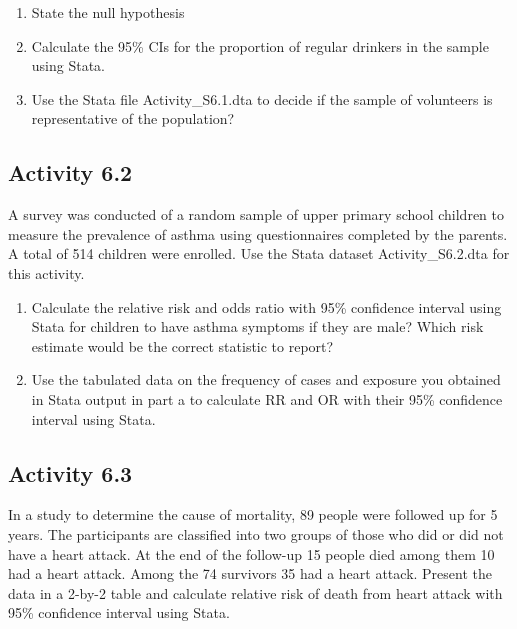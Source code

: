 \documentclass[
]{memoir}
\providecommand{\tightlist}{%
  \setlength{\itemsep}{0pt}\setlength{\parskip}{0pt}}
\begin{document}
\begin{enumerate}
\def\labelenumi{\alph{enumi})}
\tightlist
\item
  State the null hypothesis
\item
  Calculate the 95\% CIs for the proportion of regular drinkers in the sample using Stata.
\item
  Use the Stata file Activity\_S6.1.dta to decide if the sample of volunteers is representative of the population?
\end{enumerate}

\hypertarget{activity-6.2}{%
\subsection*{Activity 6.2}\label{activity-6.2}}

A survey was conducted of a random sample of upper primary school children to measure the prevalence of asthma using questionnaires completed by the parents. A total of 514 children were enrolled. Use the Stata dataset Activity\_S6.2.dta for this activity.

\begin{enumerate}
\def\labelenumi{\alph{enumi})}
\tightlist
\item
  Calculate the relative risk and odds ratio with 95\% confidence interval using Stata for children to have asthma symptoms if they are male? Which risk estimate would be the correct statistic to report?
\item
  Use the tabulated data on the frequency of cases and exposure you obtained in Stata output in part a to calculate RR and OR with their 95\% confidence interval using Stata.
\end{enumerate}

\hypertarget{activity-6.3}{%
\subsection*{Activity 6.3}\label{activity-6.3}}

In a study to determine the cause of mortality, 89 people were followed up for 5 years. The participants are classified into two groups of those who did or did not have a heart attack. At the end of the follow-up 15 people died among them 10 had a heart attack. Among the 74 survivors 35 had a heart attack. Present the data in a 2-by-2 table and calculate relative risk of death from heart attack with 95\% confidence interval using Stata.
\end{document}
